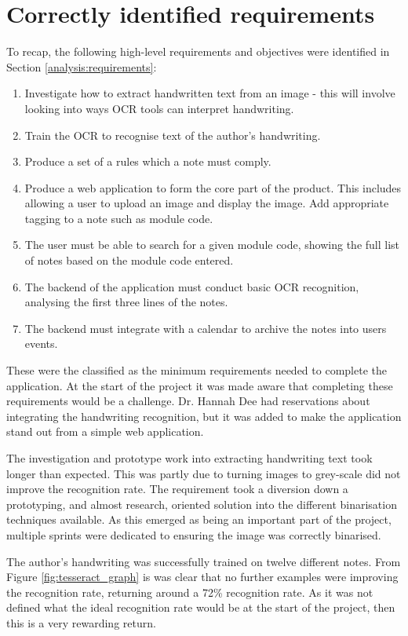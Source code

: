 \section{Correctly identified requirements}
To recap, the following high-level requirements and objectives were identified in Section \ref{analysis:requirements}:
\begin{enumerate}
	\item Investigate how to extract handwritten text from an image - this will involve looking into ways OCR tools can interpret handwriting.
	\item Train the OCR to recognise text of the author's handwriting.
	\item Produce a set of a rules which a note must comply.
	\item Produce a web application to form the core part of the product. This includes allowing a user to upload an image and display the image. Add appropriate tagging to a note such as module code.
	\item The user must be able to search for a given module code, showing the full list of notes based on the module code entered.
	\item The backend of the application must conduct basic OCR recognition, analysing the first three lines of the notes.
	\item The backend must integrate with a calendar to archive the notes into users events.
\end{enumerate}

\noindent
These were the classified as the minimum requirements needed to complete the application. At the start of the project it was made aware that completing these requirements would be a challenge. Dr. Hannah Dee had reservations about integrating the handwriting recognition, but it was added to make the application stand out from a simple web application.

The investigation and prototype work into extracting handwriting text took longer than expected. This was partly due to turning images to grey-scale did not improve the recognition rate. The requirement took a diversion down a prototyping, and almost research, oriented solution into the different binarisation techniques available. As this emerged as being an important part of the project, multiple sprints were dedicated to ensuring the image was correctly binarised.

The author's handwriting was successfully trained on twelve different notes. From Figure \ref{fig:tesseract_graph} is was clear that no further examples were improving the recognition rate, returning around a 72\% recognition rate. As it was not defined what the ideal recognition rate would be at the start of the project, then this is a very rewarding return.

